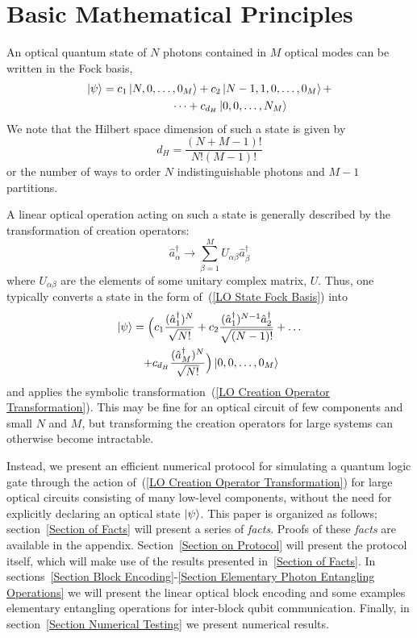 \documentclass[aps,pra,twocolumn,showpacs,superscriptaddress,floatfix,10pt]{revtex4}
\begin{document}
\section{Basic Mathematical Principles}
\label{Intro}
An optical quantum state of $N$ photons contained in $M$ optical modes can be written in the Fock basis,
\begin{eqnarray}
	\label{LO State Fock Basis}
	\ket{\psi} = c_1 \ket{N,0,\dots,0_M} + c_2 \ket{N-1,1,0,\dots, 0_M} + \\* \dots  + c_{d_H} \ket{0,0,\dots,N_M}	\nonumber \quad \quad \quad \quad
\end{eqnarray}
We note that the Hilbert space dimension of such a state is given by
\begin{equation}
\label{Hilbert Space Dimension}
	d_H = \frac{(N+M-1)!}{N!(M-1)!}
\end{equation}
or the number of ways to order $N$ indistinguishable photons and $M-1$ partitions.

A linear optical operation acting on such a state is generally described by the transformation of creation operators:
\begin{equation}
\label{LO Creation Operator Transformation}
\hat{a}^\dagger_\alpha \rightarrow \sum_{\beta=1}^{M} U_{\alpha\beta} \hat{a}^\dagger_\beta
\end{equation}
where $U_{\alpha \beta}$ are the elements of some unitary complex matrix, $U$. Thus, one typically converts a state in the form of~(\ref{LO State Fock Basis}) into
\begin{eqnarray}
\ket{\psi} = \Big(c_1 \frac{(\hat{a}^\dagger_1)^N}{\sqrt{N!}} + c_2 \frac{ (\hat{a}^\dagger_1)^{N-1} \hat{a}^\dagger_2}{\sqrt{(N-1)!}} + \dots \\* + c_{d_H} \frac{(\hat{a}^\dagger_M)^N}{\sqrt{N!}}\Big) \ket{0,0,\dots,0_M} \quad \quad \nonumber
\end{eqnarray}
and applies the symbolic transformation~(\ref{LO Creation Operator Transformation}). This may be fine for an optical circuit of few components and small $N$ and $M$, but transforming the creation operators for large systems can otherwise become intractable. 

Instead, we present an efficient numerical protocol for simulating a quantum logic gate through the action of~(\ref{LO Creation Operator Transformation}) for large optical circuits consisting of many low-level components, without the need for explicitly declaring an optical state $\ket{\psi}$. This paper is organized as follows; section~\ref{Section of Facts} will present a series of \textit{facts}. Proofs of these \textit{facts} are available in the appendix. Section~\ref{Section on Protocol} will present the protocol itself, which will make use of the results presented in~\ref{Section of Facts}. In sections~\ref{Section Block Encoding}-\ref{Section Elementary Photon Entangling Operations} we will present the linear optical block encoding and some examples elementary entangling operations for inter-block qubit communication. Finally, in section~\ref{Section Numerical Testing} we present numerical results.
\end{document}
